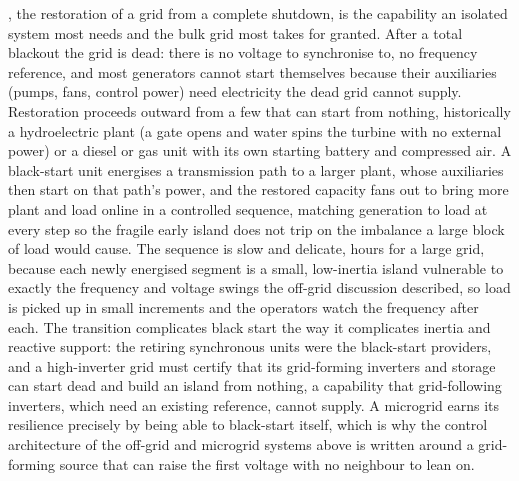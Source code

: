 , the restoration of a grid from a complete shutdown, is
the capability an isolated system most needs and the bulk grid most takes for
granted. After a total blackout the grid is dead: there is no voltage to
synchronise to, no frequency reference, and most generators cannot start
themselves because their auxiliaries (pumps, fans, control power) need
electricity the dead grid cannot supply. Restoration proceeds outward from a
few  that can start from nothing, historically a
hydroelectric plant (a gate opens and water spins the turbine with no external
power) or a diesel or gas unit with its own starting battery and compressed
air. A black-start unit energises a transmission path to a larger plant, whose
auxiliaries then start on that path's power, and the restored capacity fans out
to bring more plant and load online in a controlled sequence, matching
generation to load at every step so the fragile early island does not trip on
the imbalance a large block of load would cause. The sequence is slow and
delicate, hours for a large grid, because each newly energised segment is a
small, low-inertia island vulnerable to exactly the frequency and voltage
swings the off-grid discussion described, so load is picked up in small
increments and the operators watch the frequency after each. The transition
complicates black start the way it complicates inertia and reactive support:
the retiring synchronous units were the black-start providers, and a
high-inverter grid must certify that its grid-forming inverters and storage can
start dead and build an island from nothing, a capability that grid-following
inverters, which need an existing reference, cannot supply. A microgrid earns
its resilience precisely by being able to black-start itself, which is why the
control architecture of the off-grid and microgrid systems above is written
around a grid-forming source that can raise the first voltage with no
neighbour to lean on.

